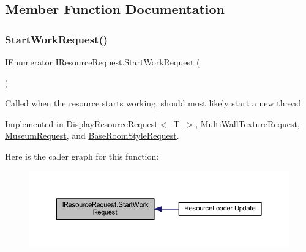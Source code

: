 \subsection{Member Function Documentation}
\mbox{\label{interface_i_resource_request_a5b40a09cb820283600ac9e3f846936f9}} 
\subsubsection{\texorpdfstring{Start\+Work\+Request()}{StartWorkRequest()}}
{\footnotesize\ttfamily I\+Enumerator I\+Resource\+Request.\+Start\+Work\+Request (\begin{DoxyParamCaption}{ }\end{DoxyParamCaption})}



Called when the resource starts working, should most likely start a new thread 



Implemented in \mbox{\hyperlink{class_display_resource_request_ab447f9d42e473b8bc8839c6f3d306a17}{Display\+Resource\+Request$<$ T $>$}}, \mbox{\hyperlink{class_multi_wall_texture_request_a9990230b6a9cb6be581b7948f379065b}{Multi\+Wall\+Texture\+Request}}, \mbox{\hyperlink{class_museum_request_a41b1a4699551a86415a877d5380febe1}{Museum\+Request}}, and \mbox{\hyperlink{class_base_room_style_request_af2ac2de206ad154351cf6a1b1e7befd5}{Base\+Room\+Style\+Request}}.

Here is the caller graph for this function\+:
\nopagebreak
\begin{figure}[H]
\begin{center}
\leavevmode
\includegraphics[width=350pt]{interface_i_resource_request_a5b40a09cb820283600ac9e3f846936f9_icgraph}
\end{center}
\end{figure}
\mbox{\label{interface_i_resource_request_a056e427fa6233602456ccb2d4c405aa0}} 
